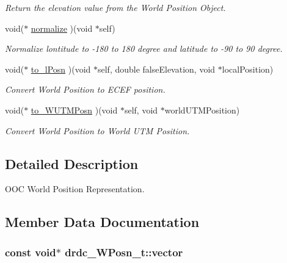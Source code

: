 \begin{CompactItemize}
\begin{CompactList}\small\item\em Return the elevation value from the World Position Object. \item\end{CompactList}\item 
void($\ast$ \hyperlink{structdrdc__WPosn__t_e1872c4419c8931346d0aa0e0cb9a735}{normalize} )(void $\ast$self)
\begin{CompactList}\small\item\em Normalize lontitude to -180 to 180 degree and latitude to -90 to 90 degree. \item\end{CompactList}\item 
void($\ast$ \hyperlink{structdrdc__WPosn__t_a82ed390a46b077cc3a9c02be37bf784}{to\_\-lPosn} )(void $\ast$self, double falseElevation, void $\ast$localPosition)
\begin{CompactList}\small\item\em Convert World Position to ECEF position. \item\end{CompactList}\item 
void($\ast$ \hyperlink{structdrdc__WPosn__t_68bd9dd868af662b51976bd7a6c50aa3}{to\_\-WUTMPosn} )(void $\ast$self, void $\ast$worldUTMPosition)
\begin{CompactList}\small\item\em Convert World Position to World UTM Position. \item\end{CompactList}\end{CompactItemize}


\subsection{Detailed Description}
OOC World Position Representation. 



\subsection{Member Data Documentation}
\hypertarget{structdrdc__WPosn__t_dd71fc55fbe80eaa57e0666d661395e8}{
\subsubsection[vector]{\setlength{\rightskip}{0pt plus 5cm}const void$\ast$ {\bf drdc\_\-WPosn\_\-t::vector}}}
\label{structdrdc__WPosn__t_dd71fc55fbe80eaa57e0666d661395e8}



